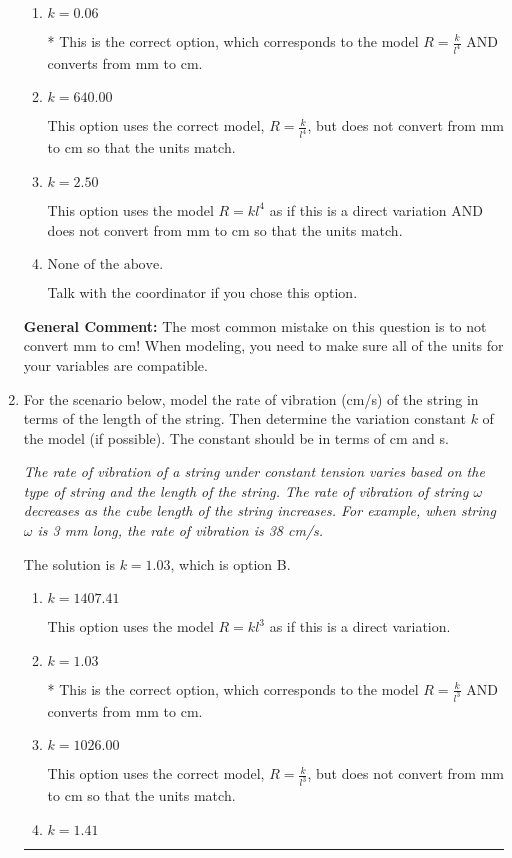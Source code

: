 \documentclass{extbook}[14pt]
\newcommand{\litem}[1]{\item #1

\rule{\textwidth}{0.4pt}}
\begin{document}
\begin{enumerate}
{\begin{enumerate}[label=\Alph*.]
This option uses the model $R = kl^{4}$ as if this is a direct variation.
\item \( k = 0.06 \)

* This is the correct option, which corresponds to the model $R = \frac{k}{l^{4}}$ AND converts from mm to cm.
\item \( k = 640.00 \)

This option uses the correct model, $R = \frac{k}{l^{4}}$, but does not convert from mm to cm so that the units match.
\item \( k = 2.50 \)

This option uses the model $R = kl^{4}$ as if this is a direct variation AND does not convert from mm to cm so that the units match.
\item \( \text{None of the above.} \)

Talk with the coordinator if you chose this option.
\end{enumerate}

\textbf{General Comment:} The most common mistake on this question is to not convert mm to cm! When modeling, you need to make sure all of the units for your variables are compatible.
}
\litem{
For the scenario below, model the rate of vibration (cm/s) of the string in terms of the length of the string. Then determine the variation constant $k$ of the model (if possible). The constant should be in terms of cm and s.

\begin{center}
    \textit{ The rate of vibration of a string under constant tension varies based on the type of string and the length of the string. The rate of vibration of string $\omega$ decreases as the cube length of the string increases. For example, when string $\omega$ is 3 mm long, the rate of vibration is 38 cm/s. }
\end{center}
The solution is \( k = 1.03 \), which is option B.\begin{enumerate}[label=\Alph*.]
\item \( k = 1407.41 \)

This option uses the model $R = kl^{3}$ as if this is a direct variation.
\item \( k = 1.03 \)

* This is the correct option, which corresponds to the model $R = \frac{k}{l^{3}}$ AND converts from mm to cm.
\item \( k = 1026.00 \)

This option uses the correct model, $R = \frac{k}{l^{3}}$, but does not convert from mm to cm so that the units match.
\item \( k = 1.41 \)


\end{enumerate}}
\end{enumerate}
\end{document}
